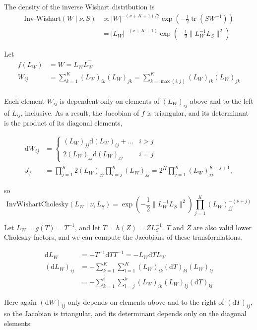 \documentclass{article}
\newcommand{\InvWish}{\text{Inv-Wishart}}
\begin{document}
The density of the inverse Wishart distribution is
\begin{align*}
    \InvWish(W \mid \nu, S) &\propto |W|^{-(\nu+K+1)/2}\exp\left(-\frac{1}{2}\operatorname{tr}(S W^{-1})\right)\\
    &= |L_W|^{-(\nu+K+1)}\exp\left(-\frac{1}{2}\lVert L_W^{-1} L_S\rVert^2\right)
\end{align*}

Let
\begin{align*}
f(L_W) &= W = L_W L_W^\top\\
W_{ij} &= \sum_{k=1}^K (L_W)_{ik} (L_W)_{jk} = \sum_{k=\max(i,j)}^K (L_W)_{ik} (L_W)_{jk}\\
\end{align*}

Each element $W_{ij}$ is dependent only on elements of $(L_W)_{ij}$ above and to the left of $L_{ij}$, inclusive.
As a result, the Jacobian of $f$ is triangular, and its determinant is the product of its diagonal elements,

\begin{align*}
\mathrm{d}W_{ij} &= \begin{cases}
    (L_W)_{jj} \mathrm{d}(L_W)_{ij} + \ldots & i > j\\
    2(L_W)_{jj} \mathrm{d}(L_W)_{jj} & i = j
\end{cases}\\
J_f &= \prod_{j=1}^K 2(L_W)_{jj} \prod_{i=j}^K (L_W)_{jj} = 2^K \prod_{j=1}^K (L_W)_{jj}^{K-j+1},
\end{align*}

so
\[
    \mathrm{InvWishartCholesky}(L_W \mid \nu, L_S) = \exp\left(-\frac{1}{2}\lVert L_W^{-1} L_S\rVert^2\right) \prod_{j=1}^K (L_W)_{jj}^{-(\nu + j)}
\]

Let $L_W = g(T) = T^{-1}$, and let $T = h(Z) = Z L_S^{-1}$.
$T$ and $Z$ are also valid lower Cholesky factors, and we can compute the Jacobians of these transformations.

\begin{align*}
    \mathrm{d}L_W &= -T^{-1} \mathrm{d}T T^{-1} = -L_W \mathrm{d}T L_W\\
    (\mathrm{d}L_W)_{ij} &= -\sum_{k=1}^K \sum_{l=1}^K (L_W)_{ik} (\mathrm{d}T)_{kl} (L_W)_{lj} \\
    &= -\sum_{k=1}^i \sum_{l=j}^k (L_W)_{ik} (L_W)_{lj} (\mathrm{d}T)_{kl}
\end{align*}

Here again $(\mathrm{d}W)_{ij}$ only depends on elements above and to the right of $(\mathrm{d}T)_{ij}$, so the Jacobian is triangular, and its determinant depends only on the diagonal elements:
\end{document}
